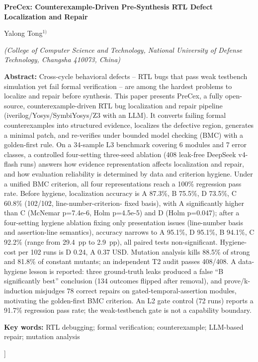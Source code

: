 \documentclass[twocolumn,10pt]{ctexart}
\begin{document}
\begin{center}
  {\bfseries\fontsize{13.5}{18}\selectfont PreCex: Counterexample-Driven Pre-Synthesis RTL Defect Localization and Repair}\par
  \vspace{5pt}
  {\normalsize Yalong Tong$^{1)}$}\par
  \vspace{3pt}
  {\small\itshape (College of Computer Science and Technology, National University of Defense Technology, Changsha 410073, China)}\par
  \vspace{6pt}
\end{center}
\begin{flushleft}
  {\bfseries Abstract:} {\small Cross-cycle behavioral defects -- RTL bugs that pass weak testbench
  simulation yet fail formal verification -- are among the hardest problems to localize and repair
  before synthesis. This paper presents PreCex, a fully open-source, counterexample-driven RTL bug
  localization and repair pipeline (iverilog/Yosys/SymbiYosys/Z3 with an LLM). It converts failing
  formal counterexamples into structured evidence, localizes the defective region, generates a minimal
  patch, and re-verifies under bounded model checking (BMC) with a golden-first rule. On a 34-sample
  L3 benchmark covering 6 modules and 7 error classes, a controlled four-setting three-seed ablation
  (408 leak-free DeepSeek v4-flash runs) answers how evidence representation affects localization and
  repair, and how evaluation reliability is determined by data and criterion hygiene. Under a unified
  BMC criterion, all four representations reach a 100\% regression pass rate. Before hygiene,
  localization accuracy is A 87.3\%, B 75.5\%, D 73.5\%, C 60.8\% (102/102, line-number-criterion-
  fixed basis), with A significantly higher than C (McNemar p=7.4e-6, Holm p=4.5e-5) and D
  (Holm p=0.047); after a four-setting hygiene ablation fixing only presentation issues (line-number
  basis and assertion-line semantics), accuracy narrows to A 95.1\%, D 95.1\%, B 94.1\%, C 92.2\%
  (range from 29.4~pp to 2.9~pp), all paired tests non-significant. Hygiene-cost per 102 runs is
  D 0.24, A 0.37 USD. Mutation analysis kills 88.5\% of strong and 81.8\% of constant mutants; an
  independent T2 audit passes 408/408. A data-hygiene lesson is reported: three ground-truth leaks
  produced a false “B significantly best” conclusion (134 outcomes flipped after removal), and
  prove/k-induction misjudges 78 correct repairs on gated-temporal-assertion modules, motivating
  the golden-first BMC criterion. An L2 gate control (72 runs) reports a 91.7\% regression pass
  rate; the weak-testbench gate is not a capability boundary.}\par
  \vspace{3pt}
  {\bfseries Key words:} {\small RTL debugging; formal verification; counterexample; LLM-based repair; mutation analysis}\par
\end{flushleft}
]%
\end{document}
